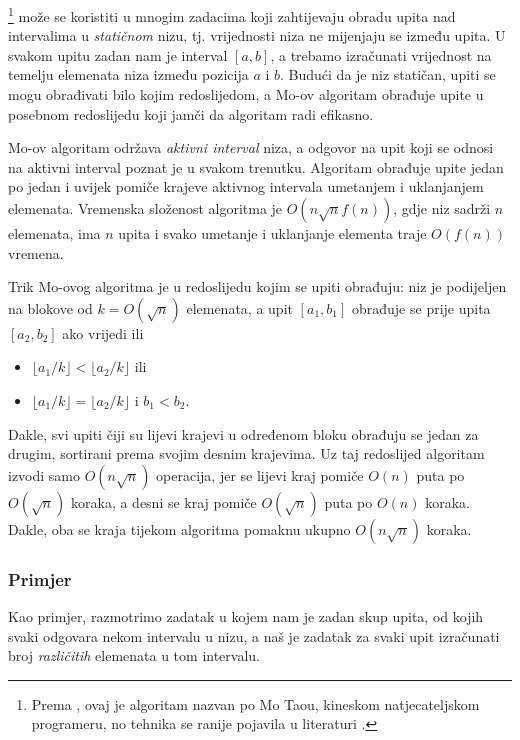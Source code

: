 
\footnote{Prema \cite{cod15}, ovaj je algoritam
nazvan po Mo Taou, kineskom natjecateljskom programeru, no
tehnika se ranije pojavila u literaturi \cite{ken06}.}
može se koristiti u mnogim zadacima
koji zahtijevaju obradu upita nad intervalima u
\emph{statičnom} nizu, tj. vrijednosti niza
ne mijenjaju se između upita.
U svakom upitu zadan nam je interval $[a,b]$,
a trebamo izračunati vrijednost na temelju
elemenata niza između pozicija $a$ i $b$.
Budući da je niz statičan,
upiti se mogu obrađivati bilo kojim redoslijedom,
a Mo-ov algoritam
obrađuje upite u posebnom redoslijedu koji jamči
da algoritam radi efikasno.

Mo-ov algoritam održava \emph{aktivni interval}
niza, a odgovor na upit
koji se odnosi na aktivni interval poznat je u svakom trenutku.
Algoritam obrađuje upite jedan po jedan
i uvijek pomiče krajeve
aktivnog intervala umetanjem i uklanjanjem elemenata.
Vremenska složenost algoritma je
$O(n \sqrt n f(n))$, gdje niz sadrži
$n$ elemenata, ima $n$ upita
i svako umetanje i uklanjanje elementa
traje $O(f(n))$ vremena.

Trik Mo-ovog algoritma je u redoslijedu
kojim se upiti obrađuju:
niz je podijeljen na blokove od $k=O(\sqrt n)$
elemenata, a upit $[a_1,b_1]$
obrađuje se prije upita $[a_2,b_2]$
ako vrijedi ili
\begin{itemize}
\item $\lfloor a_1/k \rfloor < \lfloor a_2/k \rfloor$ ili
\item $\lfloor a_1/k \rfloor = \lfloor a_2/k \rfloor$ i $b_1 < b_2$.
\end{itemize}

Dakle, svi upiti čiji su lijevi krajevi
u određenom bloku obrađuju se jedan za drugim,
sortirani prema svojim desnim krajevima.
Uz taj redoslijed algoritam
izvodi samo $O(n \sqrt n)$ operacija,
jer se lijevi kraj pomiče
$O(n)$ puta po $O(\sqrt n)$ koraka,
a desni se kraj pomiče
$O(\sqrt n)$ puta po $O(n)$ koraka. Dakle, oba se
kraja tijekom algoritma pomaknu ukupno $O(n \sqrt n)$ koraka.

\subsubsection*{Primjer}

Kao primjer, razmotrimo zadatak
u kojem nam je zadan skup upita,
od kojih svaki odgovara nekom intervalu u nizu,
a naš je zadatak za svaki upit izračunati
broj \emph{različitih} elemenata u tom intervalu.

